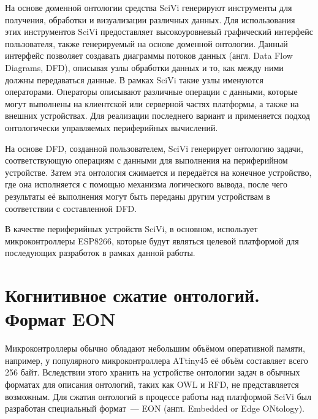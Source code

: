 На основе доменной онтологии средства SciVi генерируют инструменты для получения, обработки и визуализации различных данных.
Для использования этих инструментов SciVi предоставляет высокоуровневый графический интерфейс пользователя, также генерируемый на основе доменной онтологии.
Данный интерфейс позволяет создавать диаграммы потоков данных (англ. Data Flow Diagrams, DFD), описывая узлы обработки данных и то, как между ними должны передаваться данные.
В рамках SciVi такие узлы именуются операторами.
Операторы описывают различные операции с данными, которые могут выполнены на клиентской или серверной частях платформы, а также на внешних устройствах.
Для реализации последнего вариант и применяется подход онтологически управляемых периферийных вычислений.

На основе DFD, созданной пользователем, SciVi генерирует онтологию задачи, соответствующую операциям с данными для выполнения на периферийном устройстве.
Затем эта онтология сжимается и передаётся на конечное устройство, где она исполняется с помощью механизма логического вывода, после чего результаты её выполнения могут быть переданы другим устройствам в соответствии с составленной DFD.

В качестве периферийных устройств SciVi, в основном, использует микроконтроллеры ESP8266, которые будут являться целевой платформой для последующих разработок в рамках данной работы.

\section{Когнитивное сжатие онтологий. Формат EON}

Микроконтроллеры обычно обладают небольшим объёмом оперативной памяти, например, у популярного микроконтроллера ATtiny45 её объём составляет всего 256 байт.
Вследствии этого хранить на устройстве онтологии задач в обычных форматах для описания онтологий, таких как OWL и RFD, не представляется возможным.
Для сжатия онтологий в процессе работы над платформой SciVi был разработан специальный формат~--- EON (англ. Embedded or Edge ONtology).

